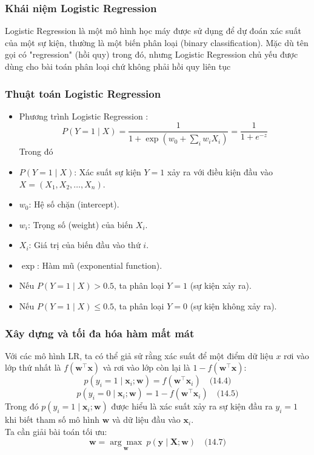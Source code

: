 \begin{enumerate}
\subsubsection{Khái niệm Logistic Regression}
Logistic Regression là một mô hình học máy được sử dụng để dự đoán xác suất của một sự kiện, thường là một biến phân loại (binary classification). Mặc dù tên gọi có "regression" (hồi quy) trong đó, nhưng Logistic Regression chủ yếu được dùng cho bài toán phân loại chứ không phải hồi quy liên tục
\subsubsection{Thuật toán Logistic Regression}
\begin{itemize}
    \item Phương trình Logistic Regression : 
    \[
P(Y = 1 \mid X) = \frac{1}{1 + \exp\left(w_0 + \sum_i w_i X_i\right)} = \frac{1}{1 + e^{-z}}
\]
    Trong đó 
    \item \(P(Y = 1 \mid X)\): Xác suất sự kiện \(Y = 1\) xảy ra với điều kiện đầu vào \(X = (X_1, X_2, \ldots, X_n)\).
    \item \(w_0\): Hệ số chặn (intercept).
    \item \(w_i\): Trọng số (weight) của biến \(X_i\).
    \item \(X_i\): Giá trị của biến đầu vào thứ \(i\).
    \item \(\exp\): Hàm mũ (exponential function).
    \item Nếu \(P(Y = 1 \mid X) > 0.5\), ta phân loại \(Y = 1\) (sự kiện xảy ra).
    \item Nếu \(P(Y = 1 \mid X) \leq 0.5\), ta phân loại \(Y = 0\) (sự kiện không xảy ra).
\end{itemize}
\subsubsection{Xây dựng và tối đa hóa hàm mất mát}
Với các mô hình LR, ta có thể giả sử rằng xác suất để một điểm dữ liệu \(x\) rơi vào lớp thứ nhất là \(f(\mathbf{w}^\top \mathbf{x})\) và rơi vào lớp còn lại là \(1 - f(\mathbf{w}^\top \mathbf{x})\):
\[
p(y_i = 1 \mid \mathbf{x}_i; \mathbf{w}) = f(\mathbf{w}^\top \mathbf{x}_i) \quad \text{(14.4)}
\]
\[
p(y_i = 0 \mid \mathbf{x}_i; \mathbf{w}) = 1 - f(\mathbf{w}^\top \mathbf{x}_i) \quad \text{(14.5)}
\]
Trong đó \(p(y_i = 1 \mid \mathbf{x}_i; \mathbf{w})\) được hiểu là xác suất xảy ra sự kiện đầu ra \(y_i = 1\) khi biết tham số mô hình \(\mathbf{w}\) và dữ liệu đầu vào \(\mathbf{x}_i\). \\
Ta cần giải bài toán tối ưu:
\[
\mathbf{w} = \underset{\mathbf{w}}{\arg\max} \ p(\mathbf{y} \mid \mathbf{X}; \mathbf{w}) \quad \text{(14.7)}
\] \\


\end{enumerate}

